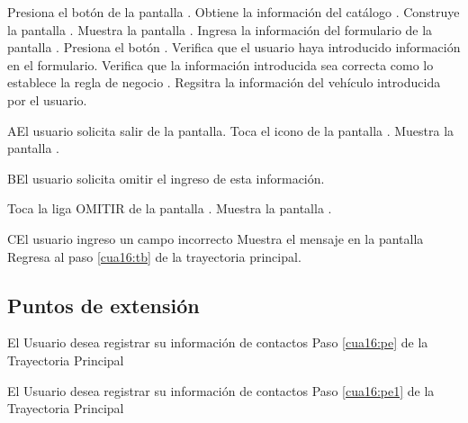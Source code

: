  \begin{UCtrayectoria}
    \UCpaso[\UCactor] Presiona el botón  de la pantalla . 
    \UCpaso[\UCsist] Obtiene la información del catálogo .
    \UCpaso[\UCsist] Construye la pantalla .
    \UCpaso[\UCsist] Muestra la pantalla .
    \UCpaso[\UCactor] Ingresa la información del formulario de la pantalla . \label{cua15:tb} 
    \UCpaso[\UCactor] Presiona el botón .  \label{cua16:pe}
    \UCpaso[\UCsist] Verifica que el usuario haya introducido información en el formulario.
    \UCpaso[\UCsist] Verifica que la información introducida sea correcta como lo establece la regla de negocio .
    \UCpaso[\UCsist] Regsitra la información del vehículo introducida por el usuario.


 \end{UCtrayectoria}



 
 \begin{UCtrayectoriaA}{A}{El usuario solicita salir de la pantalla.}
    \UCpaso[\UCactor] Toca el icono \btnRegresar de la pantalla . 
	\UCpaso[\UCsist] Muestra la pantalla .
 \end{UCtrayectoriaA}

  \begin{UCtrayectoriaA}{B}{El usuario solicita omitir el ingreso de esta información.}

    \UCpaso[\UCactor] Toca la liga OMITIR de la pantalla .\label{cua16:pe1} 
    \UCpaso[\UCsist] Muestra la pantalla .
 \end{UCtrayectoriaA}


 \begin{UCtrayectoriaA}{C}{El usuario ingreso un campo incorrecto}
	\UCpaso[\UCsist] Muestra el mensaje  en la pantalla 
	\UCpaso[] Regresa al paso \ref{cua16:tb} de la trayectoria principal. 
\end{UCtrayectoriaA}




\subsection{Puntos de extensión}


\UCExtensionPoint
{El Usuario desea registrar su información de contactos}
{ Paso \ref{cua16:pe} de la Trayectoria Principal}
{}

\UCExtensionPoint
{El Usuario desea registrar su información de contactos}
{ Paso \ref{cua16:pe1} de la Trayectoria Principal}
{}
